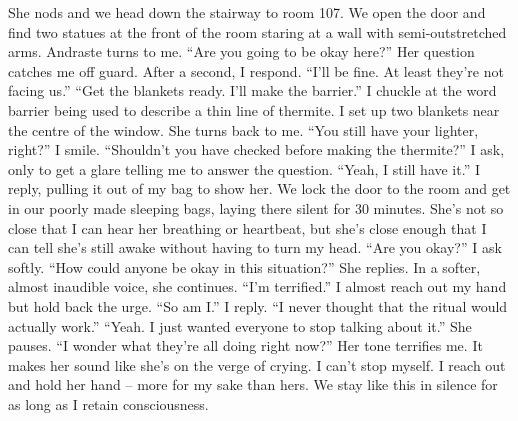 \documentclass[a4paper, 12pt]{book}
\newcommand\tab[1][1cm]{\hspace*{#1}}
\begin{document}
\tab
She nods and we head down the stairway to room 107. We open the door and find two statues at the front of the room staring at a wall with semi-outstretched arms. Andraste turns to me. ``Are you going to be okay here?'' 
\newline
\tab
Her question catches me off guard. After a second, I respond. ``I’ll be fine. At least they’re not facing us.''
\newline
\tab
``Get the blankets ready. I’ll make the barrier.'' I chuckle at the word barrier being used to describe a thin line of thermite. I set up two blankets near the centre of the window. She turns back to me. ``You still have your lighter, right?''
\newline
\tab
I smile. ``Shouldn’t you have checked before making the thermite?'' I ask, only to get a glare telling me to answer the question. ``Yeah, I still have it.'' I reply, pulling it out of my bag to show her.
\newline
\tab
We lock the door to the room and get in our poorly made sleeping bags, laying there silent for 30 minutes. She’s not so close that I can hear her breathing or heartbeat, but she’s close enough that I can tell she’s still awake without having to turn my head. ``Are you okay?'' I ask softly.
\newline
\tab
``How could anyone be okay in this situation?'' She replies. In a softer, almost inaudible voice, she continues. ``I’m terrified.''
\newline
\tab
I almost reach out my hand but hold back the urge. ``So am I.'' I reply. ``I never thought that the ritual would actually work.''
\newline
\tab
``Yeah. I just wanted everyone to stop talking about it.'' She pauses. ``I wonder what they’re all doing right now?'' Her tone terrifies me. It makes her sound like she’s on the verge of crying. I can’t stop myself. I reach out and hold her hand -- more for my sake than hers. We stay like this in silence for as long as I retain consciousness.
\end{document}
